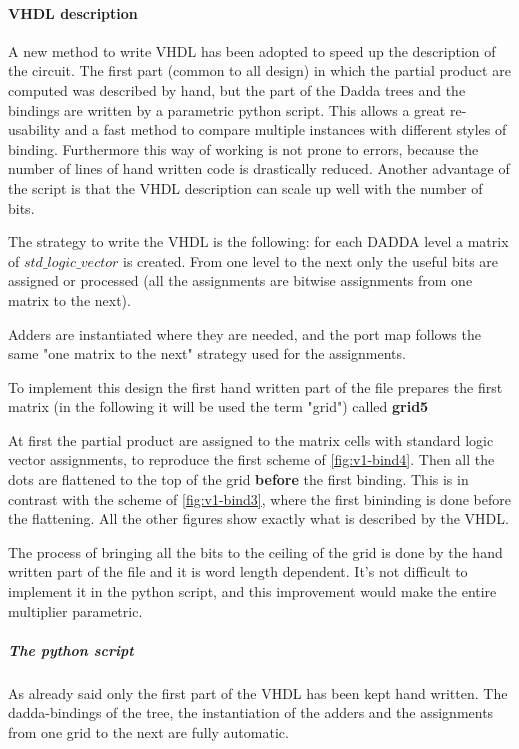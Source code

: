 \documentclass[a4paper]{article}
\begin{document}
	\paragraph{VHDL description} A new method to write VHDL has been adopted to speed up the description of the circuit. The first part (common to all design) in which the partial product are computed was described by hand, but the part of the Dadda trees and the bindings are written by a parametric python script. This allows a great re-usability and a fast method to compare multiple instances with different styles of binding.
	Furthermore this way of working is not prone to errors, because the number of lines of hand written code is drastically reduced.
	Another advantage of the script is that the VHDL description can scale up well with the number of bits.

	The strategy to write the VHDL is the following: for each DADDA level a matrix of $std\_logic\_vector$ is created. From one level to the next only the useful bits are assigned or processed (all the assignments are bitwise assignments from one matrix to the next).

	Adders are instantiated where they are needed, and the port map follows the same "one matrix to the next" strategy used for the assignments.

	To implement this design the first hand written part of the file prepares the first matrix (in the following it will be used the term "grid") called \textbf{grid5}

	At first the partial product are assigned to the matrix cells with standard logic vector assignments, to reproduce the first scheme of \ref{fig:v1-bind4}. Then all the dots are flattened to the top of the grid \textbf{before} the first binding. This is in contrast with the scheme of \ref{fig:v1-bind3}, where the first bininding is done before the flattening.
	All the other figures show exactly what is described by the VHDL.

	The process of bringing all the bits to the ceiling of the grid is done by the hand written part of the file and it is word length dependent. It's not difficult to implement it in the python script, and this improvement would make the entire multiplier parametric.

	\subparagraph{The python script}

	As already said only the first part of the VHDL has been kept hand written. The dadda-bindings of the tree, the instantiation of the adders and the assignments from one grid to the next are fully automatic.
\end{document}
